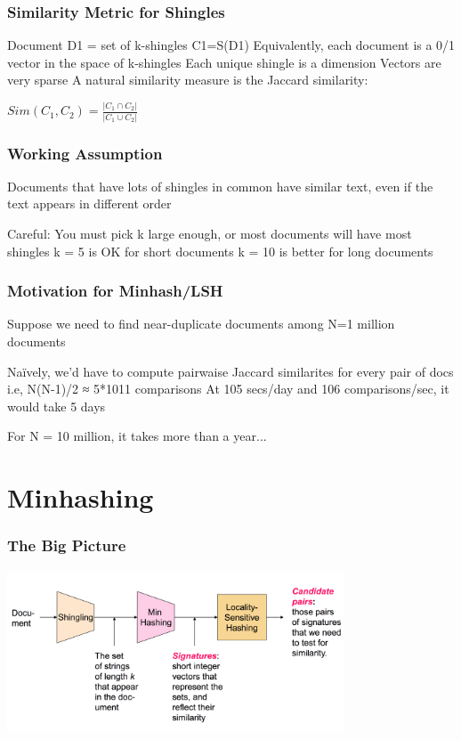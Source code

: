 \documentclass[svgnames]{beamer}
\begin{document}
  
\begin{frame} \frametitle{Similarity Metric for Shingles}


Document D1 = set of k-shingles C1=S(D1)
Equivalently, each document is a 0/1 vector in the space of k-shingles
   Each unique shingle is a dimension
    Vectors are very sparse
A natural similarity measure is the Jaccard similarity:

$Sim(C_1, C_2) = \frac{|C_1 \cap C_2|}{|C_1 \cup C_2|}$

\end{frame}

  
\begin{frame} \frametitle{Working Assumption}

Documents that have lots of shingles in common have similar text, even if the text appears in different order

Careful: You must pick k large enough, or most documents will have most shingles
   k = 5 is OK for short documents
   k = 10 is better for long documents

\end{frame}

  
\begin{frame} \frametitle{Motivation for Minhash/LSH}

Suppose we need to find near-duplicate documents among N=1 million documents

Naïvely, we’d have to compute pairwaise Jaccard similarites for every pair of docs
  i.e, N(N-1)/2 ≈ 5*1011 comparisons
  At 105 secs/day and 106 comparisons/sec, it would take 5 days

For N = 10 million, it takes more than a year...

\end{frame}

\section{Minhashing}

  
\begin{frame} \frametitle{The Big Picture}

\includegraphics[width=10cm]{overall}

\end{frame}
\end{document}
